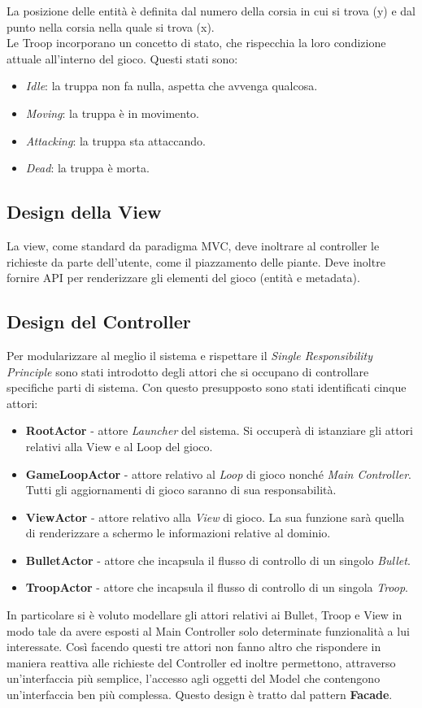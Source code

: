 La posizione delle entità è definita dal numero della corsia in cui si trova (y) e dal punto nella corsia nella quale si trova (x).\\

Le Troop incorporano un concetto di stato, che rispecchia la loro condizione attuale all'interno del gioco. Questi stati sono:
\begin{itemize}
    \item \textit{Idle}: la truppa non fa nulla, aspetta che avvenga qualcosa.
    \item \textit{Moving}: la truppa è in movimento.
    \item \textit{Attacking}: la truppa sta attaccando.
    \item \textit{Dead}: la truppa è morta.
\end{itemize}

\subsection{Design della View}
La view, come standard da paradigma MVC, deve inoltrare al controller le richieste da parte dell'utente,
come il piazzamento delle piante.
Deve inoltre fornire API per renderizzare gli elementi del gioco (entità e metadata).

\subsection{Design del Controller}
Per modularizzare al meglio il sistema e rispettare il \textit{Single Responsibility Principle}
sono stati introdotto degli attori che si occupano di controllare specifiche parti di sistema. Con questo presupposto sono
stati identificati cinque attori:
\begin{itemize}
    \item \textbf{RootActor} - attore \textit{Launcher} del sistema. Si occuperà di
    istanziare gli attori relativi alla View e al Loop del gioco.
    \item \textbf{GameLoopActor} - attore relativo al \textit{Loop} di gioco nonché
    \textit{Main Controller}. Tutti gli aggiornamenti di gioco saranno di sua responsabilità.
    \item \textbf{ViewActor} - attore relativo alla \textit{View} di gioco.
    La sua funzione sarà quella di renderizzare a schermo le informazioni relative al dominio.
    \item \textbf{BulletActor} - attore che incapsula il flusso di controllo di un singolo \textit{Bullet}.
    \item \textbf{TroopActor} - attore che incapsula il flusso di controllo di un singola \textit{Troop}.
\end{itemize}
In particolare si è voluto modellare gli attori relativi ai Bullet, Troop e
View in modo tale da avere esposti al Main
Controller solo determinate funzionalità a lui interessate.
Così facendo questi tre attori non fanno altro che rispondere
in maniera reattiva alle richieste del Controller ed inoltre permettono,
attraverso un'interfaccia più semplice, l'accesso
agli oggetti del Model che contengono un'interfaccia ben più complessa.
Questo design è tratto dal pattern \textbf{Facade}.



